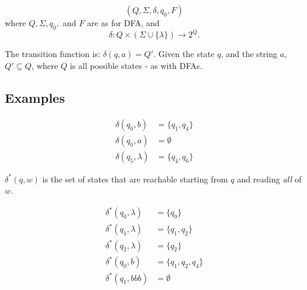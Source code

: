 \documentclass[12pt]{article}
\begin{document}
\begin{equation*}
    (Q, \Sigma, \delta, q_0, F)
\end{equation*}
where $Q, \Sigma, q_0,$ and $F$ are as for DFA, and 
\begin{equation*}
    \delta : Q \times (\Sigma \cup \{\lambda\}) \to 2^Q.
\end{equation*}

The transition function is: $\delta(q, a) = Q'$. Given the state $q$,
and the string $a$, $Q' \subseteq Q$, where $Q$ is all possible states
- as with DFAs.

\subsection*{Examples}

\begin{align*}
    \delta(q_0, b) &= \{q_1, q_4\} \\
    \delta(q_0, a) &= \emptyset \\
    \delta(q_5, \lambda) &= \{q_4, q_6\}
\end{align*}

$\delta^*(q, w)$ is the set of states that are reachable starting from
$q$ and reading \emph{all} of $w$.

\begin{align*}
    \delta^*(q_0, \lambda) &= \{q_0\}\\
    \delta^*(q_1, \lambda) &= \{q_1, q_2\}\\
    \delta^*(q_2, \lambda) &= \{q_2\}\\
    \delta^*(q_0, b) &= \{q_1, q_2, q_4\}\\
    \delta^*(q_1, bbb) &= \emptyset
\end{align*}
\end{document}

